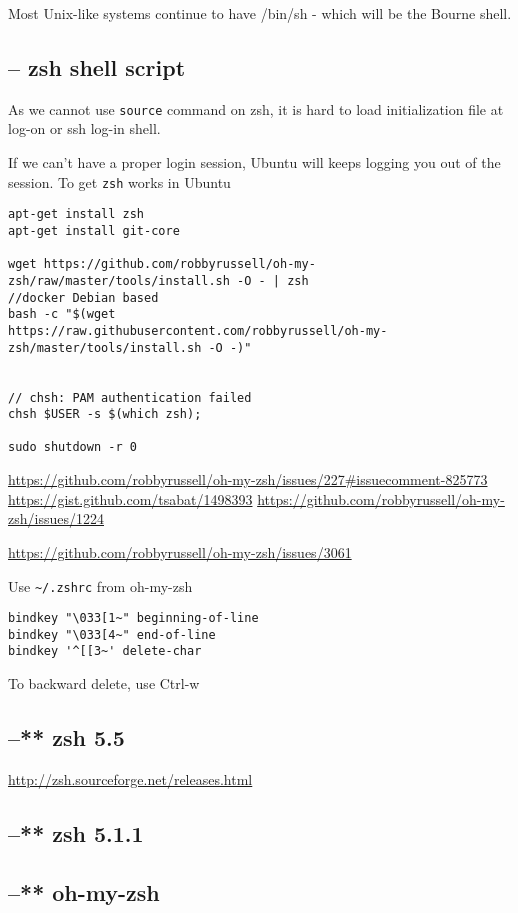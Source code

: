 Most Unix-like systems continue to
have /bin/sh - which will be the Bourne shell.


\subsection{-- zsh shell script}
\label{sec:zsh}

As we cannot use \verb!source! command on zsh, it is hard to load initialization
file at log-on or ssh log-in shell. 

If we can't have a proper login session, Ubuntu will keeps logging you out of
the session. To get \verb!zsh! works in Ubuntu
\begin{verbatim}
apt-get install zsh
apt-get install git-core

wget https://github.com/robbyrussell/oh-my-zsh/raw/master/tools/install.sh -O - | zsh
//docker Debian based
bash -c "$(wget
https://raw.githubusercontent.com/robbyrussell/oh-my-zsh/master/tools/install.sh -O -)"


// chsh: PAM authentication failed
chsh $USER -s $(which zsh); 

sudo shutdown -r 0
\end{verbatim}

\url{https://github.com/robbyrussell/oh-my-zsh/issues/227#issuecomment-825773}
\url{https://gist.github.com/tsabat/1498393}
\url{https://github.com/robbyrussell/oh-my-zsh/issues/1224}

\url{https://github.com/robbyrussell/oh-my-zsh/issues/3061}

Use \verb!~/.zshrc! from oh-my-zsh 
\begin{verbatim}
bindkey "\033[1~" beginning-of-line
bindkey "\033[4~" end-of-line
bindkey '^[[3~' delete-char
\end{verbatim}

To backward delete, use Ctrl-w 

\subsection{--** zsh 5.5}

\url{http://zsh.sourceforge.net/releases.html}

\subsection{--** zsh 5.1.1 }

\subsection{--** oh-my-zsh}
\label{sec:oh-my-zsh}

